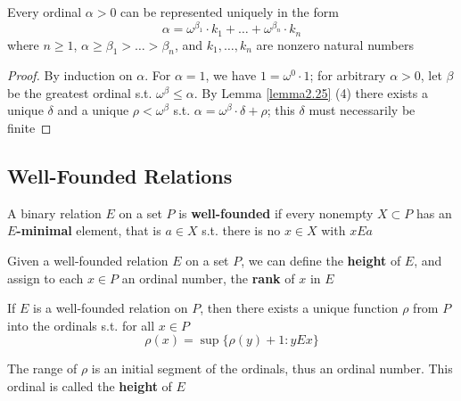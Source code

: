 \documentclass[11pt]{article}
\begin{document}
\begin{theorem}
Every ordinal \(\alpha>0\) can be represented uniquely in the form
\begin{equation*}
\alpha=\omega^{\beta_1}\cdot k_1+\dots+\omega^{\beta_n}\cdot k_n
\end{equation*}
where \(n\ge 1\), \(\alpha\ge\beta_1>\dots>\beta_n\), and \(k_1,\dots,k_n\) are nonzero natural numbers
\end{theorem}

\begin{proof}
By induction on \(\alpha\). For \(\alpha=1\), we have \(1=\omega^0\cdot 1\); for arbitrary \(\alpha>0\), let \(\beta\) be the
greatest ordinal s.t. \(\omega^\beta\le\alpha\). By Lemma \ref{lemma2.25} (4) there exists a unique \(\delta\) and a
unique \(\rho<\omega^\beta\) s.t. \(\alpha=\omega^\beta\cdot\delta+\rho\); this \(\delta\) must necessarily be finite
\end{proof}


\subsection{Well-Founded Relations}
\label{sec:org7560b82}
A binary relation \(E\) on a set \(P\) is \textbf{well-founded} if every nonempty \(X\subset P\) has an
\textbf{\(E\)-minimal} element, that is \(a\in X\) s.t. there is no \(x\in X\) with \(xEa\)

Given a well-founded relation \(E\) on a set \(P\), we can define the \textbf{height} of \(E\), and
assign to each \(x\in P\) an ordinal number, the \textbf{rank} of \(x\) in \(E\)

\begin{theorem}[]
If \(E\) is a well-founded relation on \(P\), then there exists a unique function \(\rho\) from \(P\)
into the ordinals s.t. for all \(x\in P\)
\begin{equation*}
\rho(x)=\sup\{\rho(y)+1:yEx\}
\end{equation*}
\end{theorem}

The range of \(\rho\) is an initial segment of the ordinals, thus an ordinal number. This ordinal is
called the \textbf{height} of \(E\)
\end{document}
